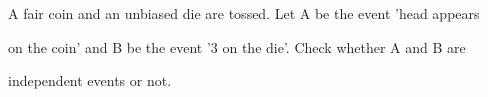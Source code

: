 \documentclass[11]{article}
\begin{document}
A fair coin and an unbiased die are tossed. Let A be the event 'head appears

on the coin' and B be the event '3 on the die'. Check whether A and B are

independent events or not.
\end{document}
